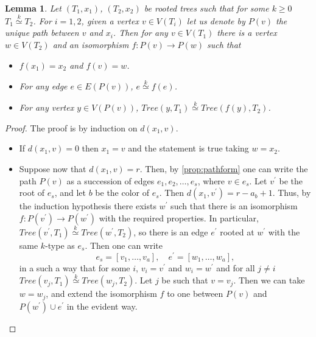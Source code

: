 \documentclass[11pt,notitlepage,a4paper]{article}
\newtheorem{lemma}{Lemma}[section]
\theoremstyle{definition}
\newcommand{\morph}[1]{\stackrel{#1}{\simeq}}
\begin{document}
\begin{lemma} \label{lem:path}
	Let $(T_1,x_1)$, $(T_2,x_2)$ be rooted trees such that for some $k\geq 0$
	$T_1\morph{k} T_2$. For $i=1,2$, given a vertex $v\in V(T_i)$ let us denote by
	$P(v)$ the unique path between $v$ and $x_i$.
	Then for any $v\in V(T_1)$ there is a vertex $w\in V(T_2)$ and an isomorphism
	$f:P(v)\rightarrow P(w)$ such that
	\begin{itemize}
		\item[(1)]  $f(x_1)=x_2$ and $f(v)=w$.
		\item[(2)] For any edge $e\in E(P(v))$, $e\morph{k} f(e)$.
		\item[(3)] For any vertex $y\in V(P(v))$, $Tree(y,T_1)\morph{k} Tree(f(y),T_2)$.
	\end{itemize}
\end{lemma}
\begin{proof}
	The proof is by induction on $d(x_1, v)$.
	\begin{itemize}[leftmargin=*]
		\item If $d(x_1,v)=0$ then $x_1=v$ and the statement is true taking $w=x_2$.
		\item Suppose now that $d(x_1,v)=r$. Then, by
		\cref{prop:pathform} one can write the path $P(v)$ as a
		succession of edges $e_1,e_2,\dots, e_s$, where $v\in e_s$.
		Let $v^\prime$ be the root of $e_s$, and let $b$ be the color
		of $e_s$.
		Then $d(x_1,v^\prime)=r-a_b+1$.
		Thus, by the
		induction hypothesis there exists $w^\prime$ such that there is an isomorphism
		$f: P(v^\prime)\rightarrow P(w^\prime)$ with the required properties. 
		In particular, $Tree(v^\prime,T_1)\morph{k}Tree(w^\prime,T_2)$, so there is an
		edge $e^\prime$ rooted at $w^\prime$ with the same $k$-type as $e_s$. Then one can write
		\[e_s=[v_1,\dots,v_a], \quad  e^\prime=[w_1,\dots,w_a], \]
		in a such a way that for some $i$, $v_i=v^\prime$ and $w_i=w^\prime$ and for all $j\neq i$
		$Tree(v_j,T_1)\morph{k} Tree(w_j,T_2)$. Let $j$ be such that $v=v_j$. Then we can take
		$w=w_j$, and extend the isomorphism $f$ to one between $P(v)$ and
		$P(w^\prime)\cup e^\prime$
		in the evident way. 
	\end{itemize}
\end{proof}
\end{document}
